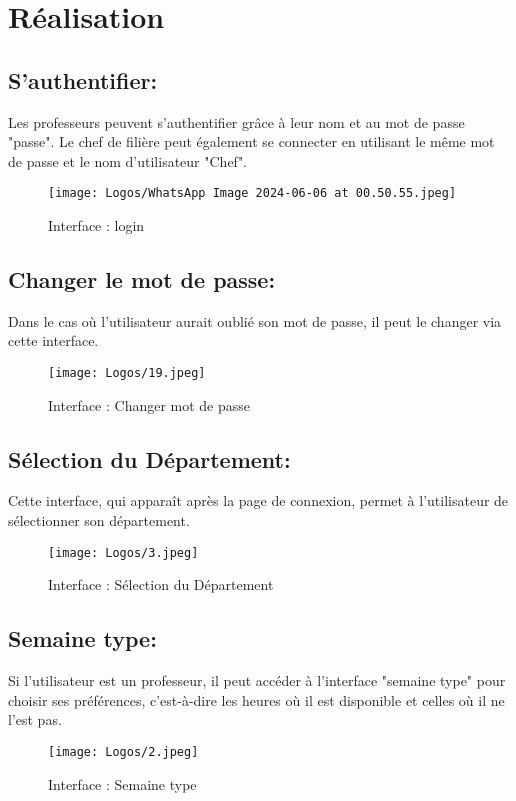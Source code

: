 \section{Réalisation}
\subsection*{S'authentifier:}
Les professeurs peuvent s'authentifier grâce à leur nom et au mot de passe "passe". Le chef de filière peut également se connecter en utilisant le même mot de passe et le nom d'utilisateur "Chef".\\
\begin{figure}[H]
      \centering
        \texttt{[image: Logos/WhatsApp Image 2024-06-06 at 00.50.55.jpeg]}
        \caption{Interface : login}
\end{figure}
\newpage
\subsection*{Changer le mot de passe:}
Dans le cas où l'utilisateur aurait oublié son mot de passe, il peut le changer via cette interface.\\
\begin{figure}[H]
      \centering
        \texttt{[image: Logos/19.jpeg]}
        \caption{Interface : Changer mot de passe}
\end{figure}
\newpage

\subsection*{Sélection du Département:}
Cette interface, qui apparaît après la page de connexion, permet à l'utilisateur de sélectionner son département.\\
\begin{figure}[H]
      \centering
        \texttt{[image: Logos/3.jpeg]}
        \caption{Interface : Sélection du Département}
\end{figure}
\newpage
\subsection*{Semaine type:}
Si l'utilisateur est un professeur, il peut accéder à l'interface "semaine type" pour choisir ses préférences, c'est-à-dire les heures où il est disponible et celles où il ne l'est pas.\\
\begin{figure}[H]
      \centering
        \texttt{[image: Logos/2.jpeg]}
        \caption{Interface : Semaine type}
\end{figure}
\newpage

